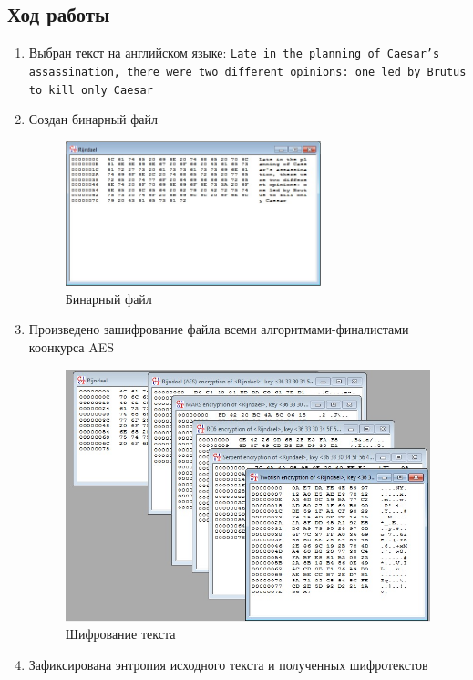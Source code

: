 \documentclass[a4paper, 14pt]{extarticle}
\begin{document}
\subsection{Ход работы}
\begin{enumerate}
    \item Выбран текст на английском языке: \texttt{Late in the planning of Caesar's assassination, there were two different opinions: one led by Brutus to kill only Caesar} 
    \item Создан бинарный файл
    \begin{figure}[h]
        \centering
        \includegraphics[width=0.7\textwidth]{img/S014.jpg}
        \caption{Бинарный файл}%
        \label{img:a:2}
    \end{figure}
    \item Произведено зашифрование файла всеми алгоритмами-финалистами коонкурса AES
    \begin{figure}[h]
        \centering
        \includegraphics[width=\textwidth]{img/S015.jpg}
        \caption{Шифрование текста}%
        \label{img:}
    \end{figure}
    \FloatBarrier{}
    \item Зафиксирована энтропия исходного текста и полученных шифротекстов

\end{enumerate}
\end{document}
